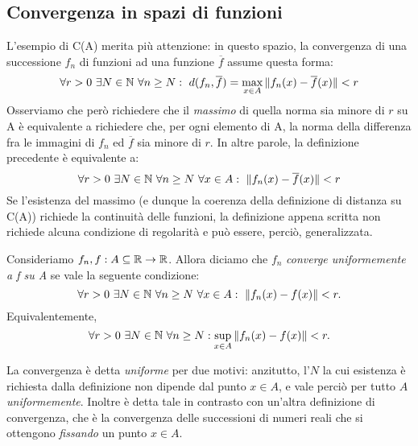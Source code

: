 \documentclass[Completo.tex]{subfiles}
\begin{document}
\subsection{Convergenza in spazi di funzioni}
\begin{Oss}
	L'esempio di C(A) merita più attenzione: in questo spazio, la convergenza di una successione $f_n$ di funzioni ad una funzione $\overline{f}$ assume questa forma:
	\begin{equation*}
		\forall r > 0 \ \exists N \in \bb[N] \ \forall n \geq N: \ d(f_n, \overline{f}) = \max\limits_{x \in A} \Vert f_n(x)-\overline{f}(x) \Vert < r
	\end{equation*}
	Osserviamo che però richiedere che il \textit{massimo} di quella norma sia minore di $r$ su A è equivalente a richiedere che, per ogni elemento di A, la norma della differenza fra le immagini di $f_n$ ed $\overline{f}$ sia minore di $r$. In altre parole, la definizione precedente è equivalente a:
	\begin{equation*}
			\forall r > 0 \ \exists N \in \bb[N] \ \forall n \geq N \ \forall x \in A: \ \Vert f_n(x)-\overline{f}(x) \Vert < r
	\end{equation*}
	Se l'esistenza del massimo (e dunque la coerenza della definizione di distanza su C(A)) richiede la continuità delle funzioni, la definizione appena scritta non richiede alcuna condizione di regolarità e può essere, perciò, generalizzata.
\end{Oss}
\begin{Def}
	Consideriamo $f_n, f: A \sseq \bb[R] \ra \bb[R]$. Allora diciamo che $f_n$ \textit{converge uniformemente a f su A} se vale la seguente condizione:
	\begin{equation*}
	\forall r > 0 \ \exists N \in \bb[N] \ \forall n \geq N \ \forall x \in A: \ \Vert f_n(x) - f(x) \Vert < r.
	\end{equation*}
	Equivalentemente,
	\begin{equation*}
	\forall r > 0 \ \exists N \in \bb[N] \ \forall n \geq N: \sup\limits_{x \in A}\Vert f_n(x) - f(x) \Vert < r.
	\end{equation*}
\end{Def}
\begin{Oss}
	La convergenza è detta \textit{uniforme} per due motivi: anzitutto, l'$N$ la cui esistenza è richiesta dalla definizione non dipende dal punto $x \in A$, e vale perciò per tutto $A$ \textit{uniformemente}. Inoltre è detta tale in contrasto con un'altra definizione di convergenza, che è la convergenza delle successioni di numeri reali che si ottengono \textit{fissando} un punto $x \in A$.
\end{Oss}
\end{document}
